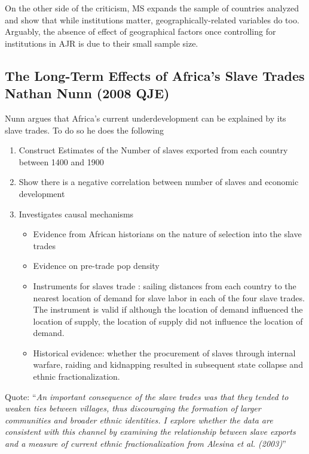\documentclass[12pt, final]{article}
\begin{document}
On the other side of the criticism, MS expands the sample of countries analyzed and show that while institutions matter, geographically-related variables do too. Arguably, the absence of effect of geographical factors once controlling for institutions in AJR is due to their small sample size.

\newpage

\subsection*{The Long-Term Effects of Africa's Slave Trades \\
Nathan Nunn (2008 QJE)} %

Nunn argues that Africa's current underdevelopment can be explained by its slave trades. To do so he does the following
\begin{enumerate}
	\item Construct Estimates of the Number of slaves exported from each country between 1400 and 1900
	\item Show there is a negative correlation between number of slaves and economic development
	\item Investigates causal mechanisms
	\begin{itemize}
		\item Evidence from African historians on the nature of selection into the slave trades
		\item Evidence on pre-trade pop density
		\item Instruments for slaves trade : sailing distances from each country to the nearest location of demand for slave labor in each of the four slave trades. The instrument is valid if although the location of demand influenced the location of supply, the location of supply did not influence the location of demand.
		\item Historical evidence: whether the procurement of slaves through internal warfare, raiding and kidnapping resulted in subsequent state collapse and ethnic fractionalization.
	\end{itemize}
\end{enumerate}
Quote: ``\textit{An important consequence of the slave trades was that they tended to weaken ties between villages, thus discouraging the formation of larger communities and broader ethnic identities. I explore whether the data are consistent with this channel by examining the relationship between slave exports and a measure of current ethnic fractionalization from Alesina et al. (2003)}''

\end{document}
